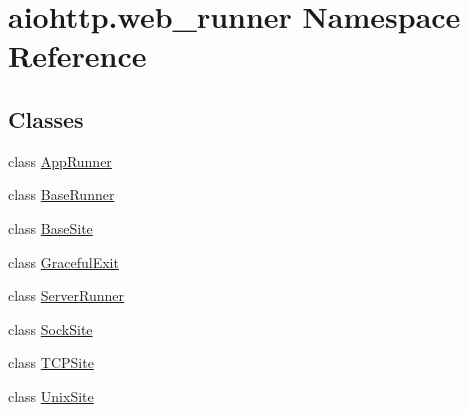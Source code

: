 \hypertarget{namespaceaiohttp_1_1web__runner}{}\section{aiohttp.\+web\+\_\+runner Namespace Reference}
\label{namespaceaiohttp_1_1web__runner}
\subsection*{Classes}
\begin{DoxyCompactItemize}
\item 
class \hyperlink{classaiohttp_1_1web__runner_1_1_app_runner}{App\+Runner}
\item 
class \hyperlink{classaiohttp_1_1web__runner_1_1_base_runner}{Base\+Runner}
\item 
class \hyperlink{classaiohttp_1_1web__runner_1_1_base_site}{Base\+Site}
\item 
class \hyperlink{classaiohttp_1_1web__runner_1_1_graceful_exit}{Graceful\+Exit}
\item 
class \hyperlink{classaiohttp_1_1web__runner_1_1_server_runner}{Server\+Runner}
\item 
class \hyperlink{classaiohttp_1_1web__runner_1_1_sock_site}{Sock\+Site}
\item 
class \hyperlink{classaiohttp_1_1web__runner_1_1_t_c_p_site}{T\+C\+P\+Site}
\item 
class \hyperlink{classaiohttp_1_1web__runner_1_1_unix_site}{Unix\+Site}
\end{DoxyCompactItemize}
